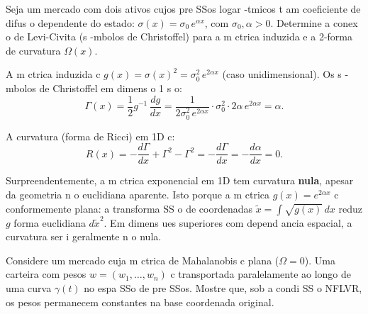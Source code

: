 \begin{exer}
\label{ex:conexao_mercado}
Seja um mercado com dois ativos cujos pre SSos logar -tmicos t am coeficiente de difus o dependente do estado: $\sigma(x) = \sigma_0\,e^{\alpha x}$, com $\sigma_0,\alpha>0$. Determine a conex o de Levi-Civita (s -mbolos de Christoffel) para a m ctrica induzida e a 2-forma de curvatura $\Omega(x)$.
\end{exer}

\begin{sol}
A m ctrica induzida c $g(x) = \sigma(x)^2 = \sigma_0^2\,e^{2\alpha x}$ (caso unidimensional). Os s -mbolos de Christoffel em dimens o 1 s o:
\begin{equation}
 \Gamma(x) = \frac{1}{2}g^{-1}\,\frac{dg}{dx} = \frac{1}{2\sigma_0^2\,e^{2\alpha x}}\cdot \sigma_0^2\cdot 2\alpha\,e^{2\alpha x} = \alpha.
\end{equation}

A curvatura (forma de Ricci) em 1D c:
\begin{equation}
 R(x) = -\frac{d\Gamma}{dx} + \Gamma^2 - \Gamma^2 = -\frac{d\Gamma}{dx} = -\frac{d\alpha}{dx} = 0.
\end{equation}

Surpreendentemente, a m ctrica exponencial em 1D tem curvatura \textbf{nula}, apesar da geometria n o euclidiana aparente. Isto porque a m ctrica $g(x)=e^{2\alpha x}$ c conformemente plana: a transforma SS o de coordenadas $\tilde x = \int\sqrt{g(x)}\,dx$ reduz $g$ forma euclidiana $d\tilde x^2$. Em dimens ues superiores com depend ancia espacial, a curvatura ser i geralmente n o nula.
\end{sol}

\begin{exer}
\label{ex:transporte_paralelo}
Considere um mercado cuja m ctrica de Mahalanobis c plana ($\Omega=0$). Uma carteira com pesos $w=(w_1,\dots,w_n)$ c transportada paralelamente ao longo de uma curva $\gamma(t)$ no espa SSo de pre SSos. Mostre que, sob a condi SS o NFLVR, os pesos permanecem constantes na base coordenada original.
\end{exer}

